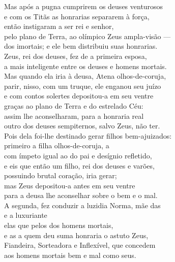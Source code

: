 \begin{pages}
\begin{Rightside}
Mas após a pugna cumprirem os deuses venturosos\\
e com os Titãs as honrarias separarem à força,\\
então instigaram a ser rei e senhor,\\
pelo plano de Terra, ao olímpico Zeus ampla-visão ---\\
dos imortais; e ele bem distribuiu suas honrarias.\\

\quad{}Zeus, rei dos deuses, fez de  a primeira esposa,\\
a mais inteligente entre os deuses e homens mortais.\\
Mas quando ela iria à deusa, Atena olhos-de-coruja,\\
parir, nisso, com um truque, ele enganou seu juízo\\
e com contos solertes depositou-a em seu ventre \\
graças ao plano de Terra e do estrelado Céu:\\
assim lhe aconselharam, para a honraria real\\
outro dos deuses sempiternos, salvo Zeus, não ter.\\
Pois dela foi-lhe destinado gerar filhos bem-ajuizados:\\
primeiro a filha olhos-de-coruja, a  \\
com ímpeto igual ao do pai e desígnio refletido,\\
e eis que então um filho, rei dos deuses e varões,\\
possuindo brutal coração, iria gerar;\\
mas Zeus depositou-a antes em seu ventre\\
para a deusa lhe aconselhar sobre o bem e o mal. \\

\quad{}A segunda, fez conduzir a luzidia Norma, mãe das \\
  e a luxuriante \\
elas que 
pelos  dos homens mortais,\\
e as  a quem deu suma honraria o astuto Zeus,\\
Fiandeira, Sorteadora e Inflexível, que concedem \\
aos homens mortais bem e mal como seus.\\


\end{Rightside}
\end{pages}
